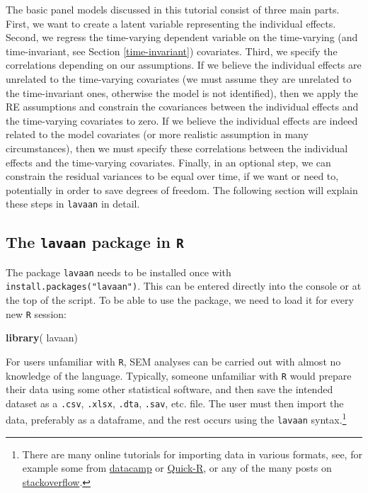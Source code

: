 \documentclass[]{interact}
\theoremstyle{plain}%
\theoremstyle{definition}
\theoremstyle{remark}
\newenvironment{Shaded}{\begin{snugshade}}{\end{snugshade}}
\newcommand{\KeywordTok}[1]{\textcolor[rgb]{0.13,0.29,0.53}{\textbf{#1}}}
\newcommand{\NormalTok}[1]{#1}
\begin{document}
The basic panel models discussed in this tutorial consist of three main
parts. First, we want to create a latent variable representing the
individual effects. Second, we regress the time-varying dependent
variable on the time-varying (and time-invariant, see Section
\ref{time-invariant}) covariates. Third, we specify the correlations
depending on our assumptions. If we believe the individual effects are
unrelated to the time-varying covariates (we must assume they are
unrelated to the time-invariant ones, otherwise the model is not
identified), then we apply the RE assumptions and constrain the
covariances between the individual effects and the time-varying
covariates to zero. If we believe the individual effects are indeed
related to the model covariates (or more realistic assumption in many
circumstances), then we must specify these correlations between the
individual effects and the time-varying covariates. Finally, in an
optional step, we can constrain the residual variances to be equal over
time, if we want or need to, potentially in order to save degrees of
freedom. The following section will explain these steps in
\texttt{lavaan} in detail.

\hypertarget{the-lavaan-package-in-r}{%
\subsection{\texorpdfstring{The \texttt{lavaan} package in
\texttt{R}}{The lavaan package in R}}\label{the-lavaan-package-in-r}}

The package \texttt{lavaan} needs to be installed once with
\texttt{install.packages("lavaan")}. This can be entered directly into
the console or at the top of the script. To be able to use the package,
we need to load it for every new \texttt{R} session:

\singlespacing

\begin{Shaded}
\begin{Highlighting}[]
\KeywordTok{library}\NormalTok{( lavaan)}
\end{Highlighting}
\end{Shaded}

\doublespacing

For users unfamiliar with \texttt{R}, SEM analyses can be carried out
with almost no knowledge of the language. Typically, someone unfamiliar
with \texttt{R} would prepare their data using some other statistical
software, and then save the intended dataset as a \texttt{.csv},
\texttt{.xlsx}, \texttt{.dta}, \texttt{.sav}, etc. file. The user must
then import the data, preferably as a dataframe, and the rest occurs
using the \texttt{lavaan} syntax.\footnote{There are many online
  tutorials for importing data in various formats, see, for example some
  from
  \href{https://www.datacamp.com/community/tutorials/r-data-import-tutorial}{datacamp}
  or
  \href{https://www.statmethods.net/input/importingdata.html}{Quick-R},
  or any of the many posts on
  \href{https://stackoverflow.com/search?q=r+import+data}{stackoverflow}.}
\end{document}

